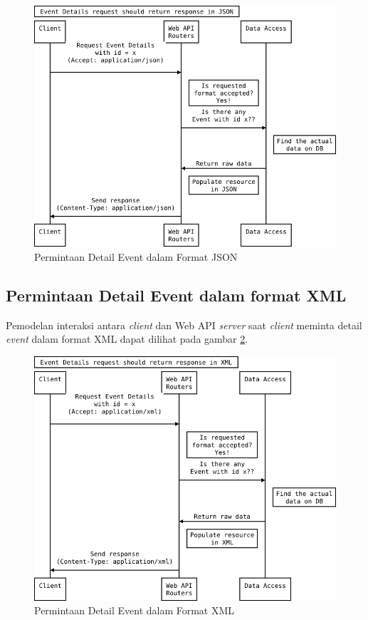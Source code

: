 \documentclass[a4paper, 12pt, oneside]{report}
\begin{document}
\begin{figure}[htp]
\centering
\includegraphics[scale=0.60]{images/event-details-request-seq-diagram-json.png}
\caption{Permintaan Detail Event dalam Format JSON}
\label{event-details-request-seq-diagram-json}
\end{figure}

\newpage

\subsection{Permintaan Detail Event dalam format XML}

\onehalfspacing Pemodelan interaksi antara \textit{client} dan Web API \textit{server} saat \textit{client} meminta detail \textit{event} dalam format XML dapat dilihat pada gambar \ref{event-details-request-seq-diagram-xml}.

\begin{figure}[htp]
\centering
\includegraphics[scale=0.60]{images/event-details-request-seq-diagram-xml.png}
\caption{Permintaan Detail Event dalam Format XML}
\label{event-details-request-seq-diagram-xml}
\end{figure}
\end{document}
